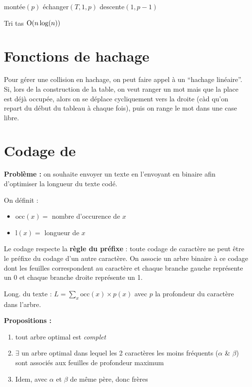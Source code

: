 \documentclass[a4paper, 8pt]{article}
\begin{document}
\begin{multicols*}{3}
\begin{algorithm}[H]
  {
  	montée$(p)$ \;
  }
  {
  	échanger$(T,1,p)$ \;
  	descente$(1,p-1)$ \;
  }
 \caption{Tri tas $\text{O}(n\log(n))$}
\end{algorithm}

\section*{Fonctions de hachage}

Pour gérer une collision en hachage, on peut faire appel à un  \enquote{hachage linéaire}. Si, lors de la construction de la table, on veut ranger un mot mais que la place est déjà occupée, alors on se déplace cycliquement vers la droite (càd qu'on repart du début du tableau à chaque fois), puis on range le mot dans une case libre.

\section*{Codage de }

\textbf{Problème :} on souhaite envoyer un texte en l'envoyant en binaire afin d'optimiser la longueur du texte codé.

\newcommand{\occ}{\text{occ}}
\newcommand{\lng}{\text{l}}
On définit :
\begin{itemize}
\item $\occ(x) =$ nombre d'occurence de $x$
\item $\lng(x) =$ longueur de $x$
\end{itemize}

Le codage respecte la \textbf{règle du préfixe} : toute codage de caractère ne peut être le préfixe du codage d'un autre caractère. On associe un arbre binaire à ce codage dont les feuilles correspondent au caractère et chaque branche gauche représente un 0 et chaque branche droite représente un 1.

Long. du texte :
$L = \sum_{x}{\occ(x)\times p(x)}$ avec $p$ la profondeur du caractère dans l'arbre.

\textbf{Propositions :}
\begin{enumerate}
\item tout arbre optimal est \emph{complet}
\item $\exists$ un arbre optimal dans lequel les 2 caractères les moins fréquents ($\alpha$ \& $\beta$) sont associés aux feuilles de profondeur maximum
\item Idem, avec $\alpha$ et $\beta$ de même père, donc frères
\end{enumerate}


\end{multicols*}
\end{document}
